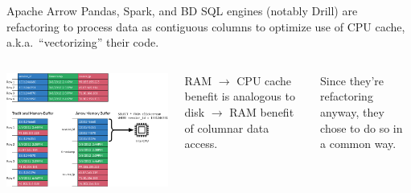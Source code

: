 \documentclass{beamer}
\begin{document}
\begin{frame}{Apache Arrow}
\vspace{0.5 cm}
Pandas, Spark, and BD SQL engines (notably Drill) are refactoring to process data as contiguous columns to optimize use of CPU cache, a.k.a.\ ``vectorizing'' their code.

\vspace{0.5 cm}
\begin{columns}
\includegraphics[width=\linewidth]{simd.png}

RAM $\to$ CPU cache benefit is analogous to disk $\to$ RAM benefit of columnar data access.

\vspace{0.5 cm}
Since they're refactoring anyway, they chose to do so in a common way.
\end{columns}
\end{frame}
\end{document}
